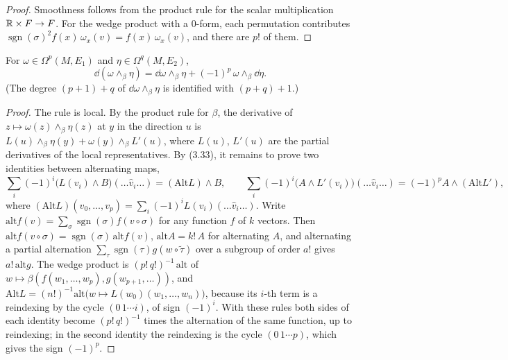\begin{proof}
  \leanok
  Smoothness follows from the product rule for the scalar multiplication $\mathbb{R} \times F \to F$.
  For the wedge product with a $0$-form, each permutation contributes $\operatorname{sgn}(\sigma)^2
  f(x)\,\omega_x(v) = f(x)\,\omega_x(v)$, and there are $p!$ of them.
\end{proof}

\begin{theorem}
  \label{thm:wedge-leibniz}
  \leanok
  For $\omega \in \Omega^p(M, E_1)$ and $\eta \in \Omega^q(M, E_2)$,
  \[
    \dd(\omega \wedge_\beta \eta) = \dd\omega \wedge_\beta \eta + (-1)^p\, \omega \wedge_\beta
    \dd\eta.
  \]
  (The degree $(p + 1) + q$ of $\dd\omega \wedge_\beta \eta$ is identified with $(p + q) + 1$.)
\end{theorem}

\begin{proof}
  \leanok
  The rule is local. By the product rule for $\beta$, the derivative of $z \mapsto
  \omega(z) \wedge_\beta \eta(z)$ at $y$ in the direction $u$ is $L(u) \wedge_\beta \eta(y) +
  \omega(y) \wedge_\beta L'(u)$, where $L(u)$, $L'(u)$ are the partial derivatives of the local
  representatives. By (3.33), it remains to prove two identities between alternating maps,
  \[
    \sum_i (-1)^i \bigl(L(v_i) \wedge B\bigr)(\dots \hat v_i \dots) = (\mathrm{Alt}L)
    \wedge B, \qquad \sum_i (-1)^i \bigl(A \wedge L'(v_i)\bigr)(\dots \hat v_i \dots) =
    (-1)^p A \wedge (\mathrm{Alt} L'),
  \]
  where $(\mathrm{Alt}L)(v_0, \dots, v_p) = \sum_i (-1)^i L(v_i)(\dots \hat v_i \dots)$. Write
  $\mathrm{alt}f(v) = \sum_\sigma \operatorname{sgn}(\sigma) f(v \circ \sigma)$ for any function $f$
  of $k$ vectors. Then $\mathrm{alt} f(v \circ \sigma) = \operatorname{sgn}(\sigma)\,
  \mathrm{alt}f(v)$, $\mathrm{alt} A = k!\, A$ for alternating $A$, and alternating a partial
  alternation $\sum_\tau \operatorname{sgn}(\tau) g(w \circ \tilde\tau)$ over a subgroup of
  order $a!$ gives $a!\, \mathrm{alt}g$. The wedge product is $(p!\,q!)^{-1}\,\mathrm{alt}$ of
  $w \mapsto \beta(f(w_1, \dots, w_p), g(w_{p+1}, \dots))$, and $\mathrm{Alt} L = (n!)^{-1}
  \mathrm{alt}\bigl(w \mapsto L(w_0)(w_1, \dots, w_n)\bigr)$, because its $i$-th term is a
  reindexing by the cycle $(0\,1 \cdots i)$, of sign $(-1)^i$. With these rules both sides of each
  identity become $(p!\,q!)^{-1}$ times the alternation of the same function, up to reindexing; in
  the second identity the reindexing is the cycle $(0\,1 \cdots p)$, which gives the sign $(-1)^p$.
\end{proof}

